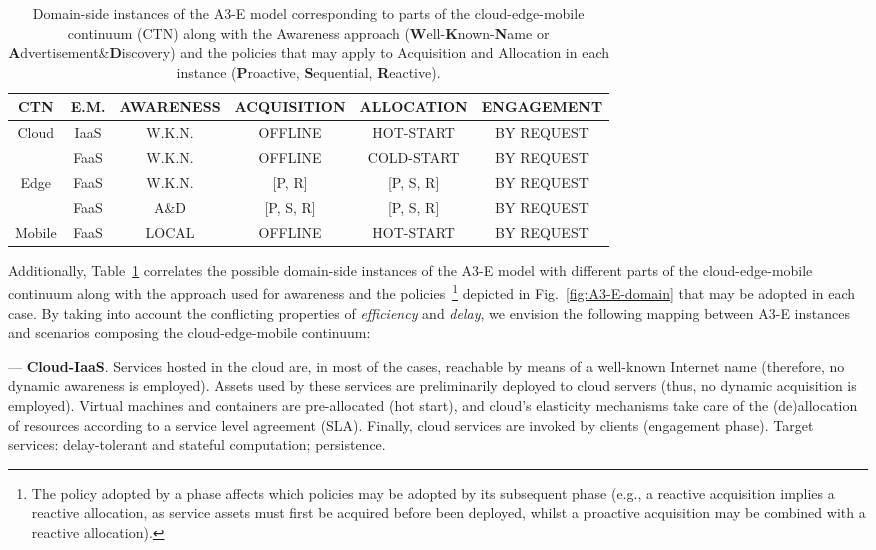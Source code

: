 \begin{center}
\begin{table}[htbp]
\small
\caption{Domain-side instances of the A3-E model corresponding to parts of the cloud-edge-mobile continuum (CTN) along with the Awareness approach (\textbf{W}ell-\textbf{K}nown-\textbf{N}ame or \textbf{A}dvertisement\&\textbf{D}iscovery) and the policies that may apply to Acquisition and Allocation in each instance (\textbf{P}roactive, \textbf{S}equential, \textbf{R}eactive). }\label{tab:A3-E-instances}
\begin{tabular}{ c c c c c c }
\toprule

CTN & E.M. & \textbf{A}WARENESS & \textbf{A}CQUISITION	& \textbf{A}LLOCATION 	& \textbf{E}NGAGEMENT  	\\

\midrule

\multirow{2}{*}{ Cloud }
& IaaS	& W.K.N.	& OFFLINE		& HOT-START	& BY REQUEST\\
& FaaS		& W.K.N.	& OFFLINE		& COLD-START	& BY REQUEST\\\midrule					
\multirow{2}{*}{ Edge }
& FaaS		& W.K.N.	& [P, R]		& [P, S, R] 	& BY REQUEST\\
& FaaS		& A\&D	& [P, S, R]		& [P, S, R]		& BY REQUEST\\\midrule	
\multirow{1}{*}{ Mobile }
& FaaS	& LOCAL  & OFFLINE	& HOT-START 	& BY REQUEST\\

\bottomrule
\end{tabular}
\end{table}
\end{center}
\normalsize

Additionally, Table~\ref{tab:A3-E-instances} correlates the possible domain-side instances of the A3-E model with different parts of the cloud-edge-mobile continuum along with the approach used for awareness and the policies~\footnote{The policy adopted by a phase affects which policies may be adopted by its subsequent phase (e.g., a reactive acquisition implies a reactive allocation, as service assets must first be acquired before been deployed, whilst a proactive acquisition may be combined with a reactive allocation).} depicted in Fig.~\ref{fig:A3-E-domain} that may be adopted in each case. By taking into account the conflicting properties of \textit{efficiency} and \textit{delay}, we envision the following mapping between A3-E instances and scenarios composing the cloud-edge-mobile continuum:

--- \textbf{Cloud-IaaS}. Services hosted in the cloud are, in most of the cases, reachable by means of a well-known Internet name (therefore, no dynamic awareness is employed). Assets used by these services are preliminarily deployed to cloud servers (thus, no dynamic acquisition is employed). Virtual machines and containers are pre-allocated (hot start), and cloud's elasticity mechanisms take care of the (de)allocation of resources according to a service level agreement (SLA). Finally, cloud services are invoked by clients (engagement phase). Target services: delay-tolerant and stateful computation; persistence.

